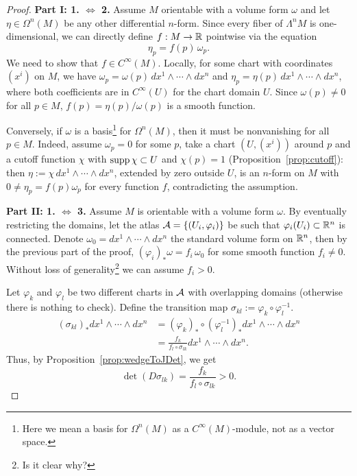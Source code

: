 \begin{proof}
	\textbf{Part I: 1. $\Leftrightarrow$ 2.}
	Assume $M$ orientable with a volume form $\omega$ and let $\eta\in\Omega^n(M)$ be any other differential $n$-form.
	Since every fiber of $\Lambda^n M$ is one-dimensional, we can directly define $f:M \to \mathbb{R}$ pointwise via the equation
	\[
		\eta_p = f(p)\,\omega_p.
	\]
	We need to show that $f\in C^\infty(M)$.
	Locally, for some chart with coordinates $(x^i)$ on $M$, we have $\omega_p = \omega(p)\, dx^1\wedge\cdots\wedge dx^n$ and $\eta_p = \eta(p)\, dx^1\wedge\cdots\wedge dx^n$, where both coefficients are in $C^\infty(U)$ for the chart domain $U$.
	Since $\omega(p) \neq 0$ for all $p\in M$, $f(p) = \eta(p)/\omega(p)$ is a smooth function.

	Conversely, if $\omega$ is a basis\footnote{Here we mean a basis for $\Omega^n(M)$ as a $C^\infty(M)$-module, not as a vector space.} for $\Omega^n(M)$, then it must be nonvanishing for all $p\in M$.
	Indeed, assume $\omega_p = 0$ for some $p$, take a chart $(U,(x^i))$ around $p$ and a cutoff function $\chi$ with $\operatorname{supp}\chi\subset U$ and $\chi(p) = 1$ (Proposition~\ref{prop:cutoff}): then $\eta := \chi\, dx^1\wedge\cdots\wedge dx^n$, extended by zero outside $U$, is an $n$-form on $M$ with $0 \neq \eta_p = f(p)\omega_p$ for every function $f$, contradicting the assumption.
	\medskip

	\textbf{Part II: 1. $\Leftrightarrow$ 3.}
	Assume $M$ is orientable with a volume form $\omega$.
	By eventually restricting the domains, let the atlas $\mathcal{A} = \{(U_i, \varphi_i)\}$ be such that $\varphi_i(U_i) \subset \mathbb{R}^n$ is connected.
	Denote $\omega_0 = dx^1 \wedge\cdots\wedge dx^n$ the standard volume form on $\mathbb{R}^n$, then by the previous part of the proof, $(\varphi_i)_*\omega = f_i\,\omega_0$ for some smooth function $f_i \neq 0$.
	Without loss of generality\footnote{Is it clear why?} we can assume $f_i > 0$.

	Let $\varphi_k$ and $\varphi_l$ be two different charts in $\mathcal{A}$ with overlapping domains (otherwise there is nothing to check).
	Define the transition map $\sigma_{kl} := \varphi_k\circ\varphi_l^{-1}$.
	\begin{align}
		(\sigma_{kl})_* dx^1\wedge\cdots\wedge dx^n & = (\varphi_k)_* \circ (\varphi_l^{-1})_* dx^1\wedge \cdots\wedge dx^n \\
		                                            & = \frac{f_k}{f_l \circ \sigma_{lk}} dx^1\wedge \cdots\wedge dx^n.
	\end{align}
	Thus, by Proposition~\ref{prop:wedgeToJDet}, we get
	\begin{equation}
		\det(D\sigma_{lk}) = \frac{f_k}{f_l \circ \sigma_{lk}} > 0.
	\end{equation}


\end{proof}
